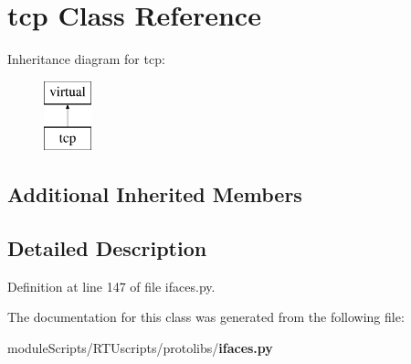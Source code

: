 \section{tcp Class Reference}
\label{classprotolibs_1_1ifaces_1_1tcp}
Inheritance diagram for tcp\+:\begin{figure}[H]
\begin{center}
\leavevmode
\includegraphics[height=2.000000cm]{classprotolibs_1_1ifaces_1_1tcp}
\end{center}
\end{figure}
\subsection*{Additional Inherited Members}


\subsection{Detailed Description}


Definition at line 147 of file ifaces.\+py.



The documentation for this class was generated from the following file\+:\begin{DoxyCompactItemize}
\item 
module\+Scripts/\+R\+T\+Uscripts/protolibs/{\bf ifaces.\+py}\end{DoxyCompactItemize}
